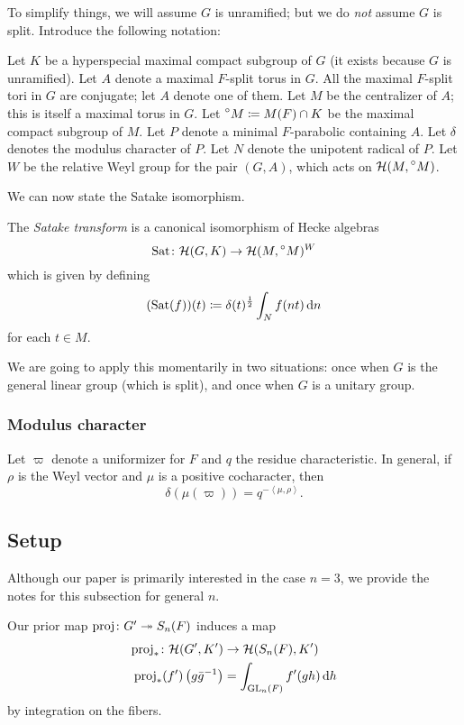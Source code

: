 To simplify things, we will assume $G$ is unramified;
but we do \emph{not} assume $G$ is split.
Introduce the following notation:
\begin{itemize}
  \ii Let $K$ be a hyperspecial maximal compact subgroup of $G$
  (it exists because $G$ is unramified).
  \ii Let $A$ denote a maximal $F$-split torus in $G$.
  All the maximal $F$-split tori in $G$ are conjugate; let $A$ denote one of them.
  \ii Let $M$ be the centralizer of $A$; this is itself a maximal torus in $G$.
  \ii Let $\prescript{\circ}{} M \coloneqq M(F) \cap K$
  be the maximal compact subgroup of $M$.
  \ii Let $P$ denote a minimal $F$-parabolic containing $A$.
  \ii Let $\delta$ denotes the modulus character of $P$.
  \ii Let $N$ denote the unipotent radical of $P$.
  \ii Let $W$ be the relative Weyl group for the pair $(G,A)$,
  which acts on $\mathcal H(M, \prescript{\circ}{} M)$.
\end{itemize}
We can now state the Satake isomorphism.
\begin{definition}
  The \emph{Satake transform} is a canonical isomorphism of Hecke algebras
  \[ \operatorname{Sat} \colon \mathcal H(G, K) \to \mathcal H(M, \prescript{\circ}{} M)^W \]
  which is given by defining
  \[ (\Sat(f))(t) \coloneqq \delta(t)^\half \int_N f(nt) \odif n  \]
  for each $t \in M$.
\end{definition}
We are going to apply this momentarily in two situations:
once when $G$ is the general linear group (which is split),
and once when $G$ is a unitary group.

\subsubsection{Modulus character}
Let $\varpi$ denote a uniformizer for $F$ and $q$ the residue characteristic.
In general, if $\rho$ is the Weyl vector and $\mu$ is a positive cocharacter, then
\[ \delta(\mu(\varpi)) = q^{- \left< \mu, \rho\right>}. \]

\subsection{Setup}
Although our paper is primarily interested in the case $n=3$,
we provide the notes for this subsection for general $n$.

Our prior map $\operatorname{proj} \colon G' \twoheadrightarrow S_n(F)$ induces a map
\begin{align*}
  \rproj_\ast \colon \HH(G', K') &\to \HH(S_n(F), K') \\
  \rproj_\ast(f')\left( g\bar{g}\inv \right) &= \int_{\GL_n(F)} f'(gh) \odif h
\end{align*}
by integration on the fibers.

